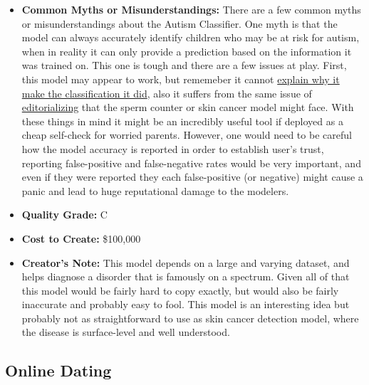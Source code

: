 \begin{itemize}
\begin{itemize}
    \item \textbf{Common Myths or Misunderstandings:}  There are a few common myths or misunderstandings about the Autism Classifier. One myth is that the model can always accurately identify children who may be at risk for autism, when in reality it can only provide a prediction based on the information it was trained on. This one is tough and there are a few issues at play. First, this model may appear to work, but rememeber it cannot \hyperref[sec:explain]{explain why it make the classification it did}, also it suffers from the same issue of \hyperref[sec:janitor]{editorializing} that the sperm counter or skin cancer model might face. With these things in mind it might be an incredibly useful tool if deployed as a cheap self-check for worried parents. However, one would need to be careful how the model accuracy is reported in order to establish user's trust, reporting false-positive and false-negative rates would be very important, and even if they were reported they each false-positive (or negative) might cause a panic and lead to huge reputational damage to the modelers.   
    \item \textbf{Quality Grade:} C
    \item \textbf{Cost to Create:} \$100,000
    \item \textbf{Creator's Note:} This model depends on a large and varying dataset, and helps diagnose a disorder that is famously on a spectrum. Given all of that this model would be fairly hard to copy exactly, but would also be fairly inaccurate and probably easy to fool. This model is an interesting idea but probably not as straightforward to use as skin cancer detection model, where the disease is surface-level and well understood.
\end{itemize}

\subsection{Online Dating}


\end{itemize}
